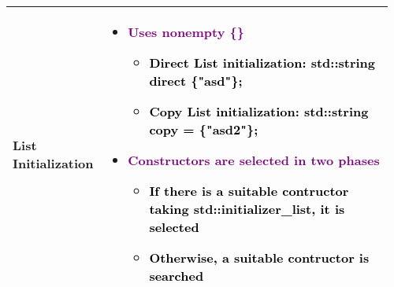 \documentclass[main.tex,fontsize=8pt,paper=a4,paper=portrait,DIV=calc,]{scrartcl}
\begin{document}
\begin{table}[ht!]
\begin{tabular}{|m{0.2\linewidth}|m{0.755\linewidth}|}
\hline
List Initialization & 
\vspace{2mm}
\begin{itemize}
  \item \textcolor{purple}{Uses nonempty \{\}}
    \begin{itemize}
      \item \textcolor{black}{Direct List initialization: std::string direct \{"asd"\};}
      \item \textcolor{black}{Copy List initialization: std::string copy = \{"asd2"\};}
    \end{itemize} 
\item \textcolor{purple}{Constructors are selected in two phases}
  \begin{itemize}
  \item \textcolor{black}{If there is a suitable contructor taking std::initializer\_list, it is selected}
  \item \textcolor{black}{Otherwise, a suitable contructor is searched}
  \end{itemize} 
\vspace{-3mm}
\end{itemize} 
\\
\hline
\end{tabular}
\end{table}
\pagebreak
\end{document}
